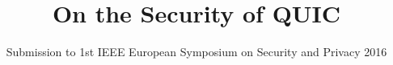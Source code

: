 \documentclass[conference]{IEEEtran}
\begin{document}
\title{On the Security of QUIC}

\author{Submission to 1st IEEE European Symposium on Security and Privacy 2016}
\maketitle

 
 
 
 
 
 
 




\end{document}
